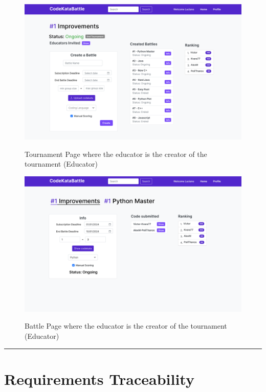 \documentclass{Configuration_Files/Template}
\begin{document}
\begin{figure}[H]
\centering
\includegraphics[scale = 0.25]{Images/UI/TournamentPage_EducatorCreator.png}\\
\caption{Tournament Page where the educator is the creator of the tournament (Educator)}
\end{figure}

\begin{figure}[H]
\centering
\includegraphics[scale = 0.25]{Images/UI/BattlePage_EducatorCreator.png}\\
\caption{Battle Page where the educator is the creator of the tournament (Educator)}
\end{figure}

{\color{bluepoli}\rule{\linewidth}{0.1pt}}

\chapter{Requirements Traceability}
\end{document}
